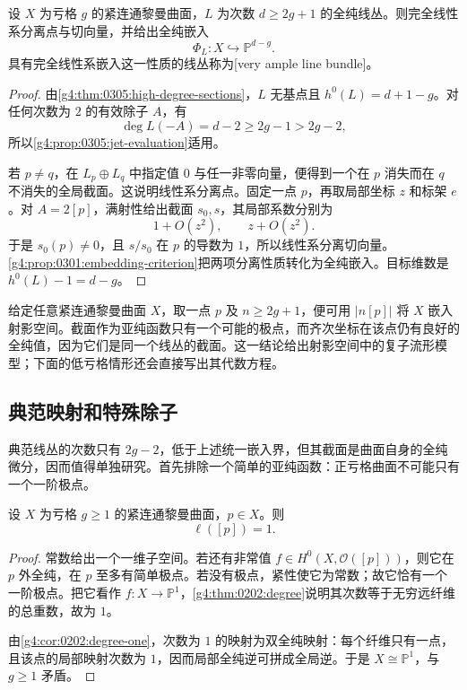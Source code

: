 \begin{theorem}\label{g4:thm:0305:very-ample}
	设 \(X\) 为亏格 \(g\) 的紧连通黎曼曲面，\(L\) 为次数 \(d\ge2g+1\) 的全纯线丛。则完全线性系分离点与切向量，并给出全纯嵌入
	\[
		\Phi_L:X\hookrightarrow\mathbb P^{d-g}.
	\]
	具有完全线性系嵌入这一性质的线丛称为[very ample line bundle]。
\end{theorem}
\begin{proof}
	由\cref{g4:thm:0305:high-degree-sections}，\(L\) 无基点且 \(h^0(L)=d+1-g\)。对任何次数为 \(2\) 的有效除子 \(A\)，有
	\[
		\deg L(-A)=d-2\ge2g-1>2g-2,
	\]
	所以\cref{g4:prop:0305:jet-evaluation}适用。

	若 \(p\ne q\)，在 \(L_p\oplus L_q\) 中指定值 \(0\) 与任一非零向量，便得到一个在 \(p\) 消失而在 \(q\) 不消失的全局截面。这说明线性系分离点。固定一点 \(p\)，再取局部坐标 \(z\) 和标架 \(e\)。对 \(A=2[p]\)，满射性给出截面 \(s_0,s\)，其局部系数分别为
	\[
		1+O(z^2),\qquad z+O(z^2).
	\]
	于是 \(s_0(p)\ne0\)，且 \(s/s_0\) 在 \(p\) 的导数为 \(1\)，所以线性系分离切向量。\cref{g4:prop:0301:embedding-criterion}把两项分离性质转化为全纯嵌入。目标维数是 \(h^0(L)-1=d-g\)。
\end{proof}

给定任意紧连通黎曼曲面 \(X\)，取一点 \(p\) 及 \(n\ge2g+1\)，便可用 \(|n[p]|\) 将 \(X\) 嵌入射影空间。截面作为亚纯函数只有一个可能的极点，而齐次坐标在该点仍有良好的全纯值，因为它们是同一个线丛的截面。这一结论给出射影空间中的复子流形模型；下面的低亏格情形还会直接写出其代数方程。

\subsection{典范映射和特殊除子}
\label{g4:subsec:0305:03}

典范线丛的次数只有 \(2g-2\)，低于上述统一嵌入界，但其截面是曲面自身的全纯微分，因而值得单独研究。首先排除一个简单的亚纯函数：正亏格曲面不可能只有一个一阶极点。

\begin{lemma}\label{g4:lem:0305:single-pole}
	设 \(X\) 为亏格 \(g\ge1\) 的紧连通黎曼曲面，\(p\in X\)。则
	\[
		\ell([p])=1.
	\]
\end{lemma}
\begin{proof}
	常数给出一个一维子空间。若还有非常值 \(f\in H^0(X,\mathcal O([p]))\)，则它在 \(p\) 外全纯，在 \(p\) 至多有简单极点。若没有极点，紧性使它为常数；故它恰有一个一阶极点。把它看作 \(f:X\to\mathbb P^1\)，\cref{g4:thm:0202:degree}说明其次数等于无穷远纤维的总重数，故为 \(1\)。

	由\cref{g4:cor:0202:degree-one}，次数为 \(1\) 的映射为双全纯映射：每个纤维只有一点，且该点的局部映射次数为 \(1\)，因而局部全纯逆可拼成全局逆。于是 \(X\cong\mathbb P^1\)，与 \(g\ge1\) 矛盾。
\end{proof}

